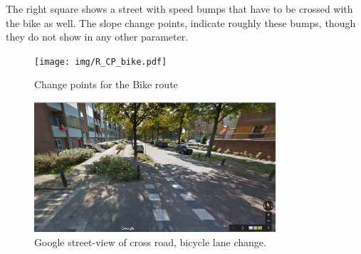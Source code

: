 The right square shows a street with speed bumps that have to be crossed with the bike as well. The slope change points, indicate roughly these bumps, though they do not show in any other parameter. 

\begin{figure}[ht]
\texttt{[image: img/R\_CP\_bike.pdf]}
\centering
\caption{Change points for the Bike route\label{routeB2}}
\end{figure} 
\begin{figure}[b]
\includegraphics[width=0.8\textwidth]{img/R_crossroad.png}
\centering
\caption{Google street-view of cross road, bicycle lane change. \label{crossroad}}
\end{figure} 
